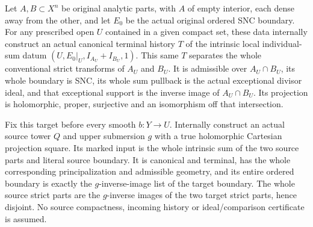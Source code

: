 \begin{theorem}
\label{hir:original-local-canonical-sum-prescribed-open-producer}
Let $A,B\subset X^n$ be original analytic parts, with $A$ of empty
interior, each dense away from the other, and let $E_0$ be the actual
original ordered SNC boundary. For any prescribed open $U$ contained
in a given compact set, these data internally construct an actual
canonical terminal history $T$ of the intrinsic local individual-sum
datum $(U,E_0|_U,I_{A_U}+I_{B_U},1)$. This same $T$ separates the
whole conventional strict transforms of $A_U$ and $B_U$. It is
admissible over $A_U\cap B_U$, its whole boundary is SNC, its whole
sum pullback is the actual exceptional divisor ideal, and that
exceptional support is the inverse image of $A_U\cap B_U$. Its
projection is holomorphic, proper, surjective and an isomorphism off
that intersection.

Fix this target before every smooth $b:Y\to U$. Internally construct
an actual source tower $Q$ and upper submersion $g$ with a true
holomorphic Cartesian projection square. Its marked input is the
whole intrinsic sum of the two source parts and literal source
boundary. It is canonical and terminal, has the whole corresponding
principalization and admissible geometry, and its entire ordered
boundary is exactly the $g$-inverse-image list of the target boundary.
The whole source strict parts are the $g$-inverse images of the two
target strict parts, hence disjoint. No source compactness, incoming
history or ideal/comparison certificate is assumed.
\leanok
\end{theorem}

